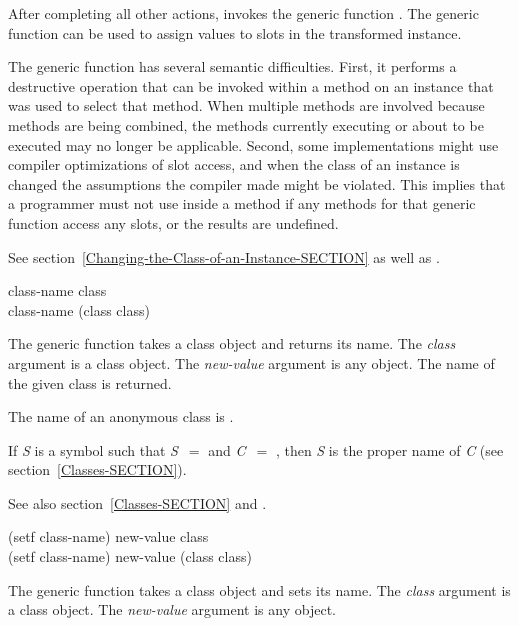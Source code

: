 \begin{defun}
After completing all other actions,  invokes the generic
function .  The generic function
can be used to assign values to slots in the transformed instance.

The generic function  has several semantic difficulties.
First, it performs a destructive operation that can be invoked within a
method on an instance that was used to select that method. When multiple
methods are involved because methods are being combined,
the methods currently executing or about to be executed
may no longer be applicable.  Second, some implementations might use compiler
optimizations of slot access, and when the class of an instance is
changed the assumptions the compiler made might be violated.
This implies that a programmer must not use 
 inside a method if any methods for that generic function 
access any slots, or the results are undefined.


See section~\ref{Changing-the-Class-of-an-Instance-SECTION} as well as
.
\end{defun}



\begin{defun}
class-name class \\
class-name (class class)

The generic function  takes a class object and returns its
name.
The \emph{class\/} argument is a class object.
The \emph{new-value\/} argument is any object.
The name of the given class is returned.

The name of an anonymous class is .

If \emph{S} is a symbol such that \emph{S}~$=$ and \emph{C}~$=$
, then \emph{S} is the proper name of \emph{C} (see section~\ref{Classes-SECTION}).

See also section~\ref{Classes-SECTION} and .
\end{defun}


\begin{defun}
(setf class-name) new-value class \\
(setf class-name) new-value (class class)

The generic function  takes a class object and sets
its name.
The \emph{class\/} argument is a class object.
The \emph{new-value\/} argument is any object.
\end{defun}


